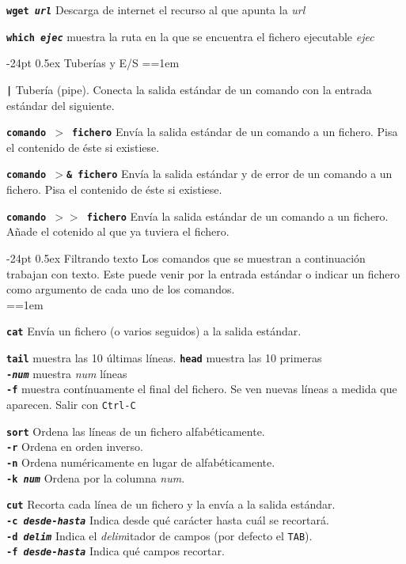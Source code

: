 \documentclass[10pt,landscape,a4paper]{article}
\makeatletter
\renewcommand\section{\@startsection{section}{1}{0mm}%
                                     {-24pt}%
                                     {0.5ex}%
                                {\normalfont\large\bfseries}}
\newcommand{\code}{\texttt}
\newcommand{\bcode}[1]{\texttt{\textbf{#1}}}
\makeatother
\begin{document}
\begin{multicols}{3}
\bcode{wget \emph{url}} Descarga de internet el recurso al que apunta la \emph{url}

\bcode{which \emph{ejec}} muestra la ruta en la que se encuentra el fichero ejecutable \emph{ejec}

\section{Tuberías y E/S}
\everypar={\hangindent=1em}

\bcode{|} Tubería (pipe). Conecta la salida estándar de un comando con la entrada estándar del siguiente.

\bcode{comando $>$ fichero} Envía la salida estándar de un comando a un fichero. Pisa el contenido de éste si existiese.

\bcode{comando $>$\& fichero} Envía la salida estándar y de error de un comando a un fichero. Pisa el contenido de éste si existiese.

\bcode{comando $>>$ fichero} Envía la salida estándar de un comando a un fichero. Añade el cotenido al que ya tuviera el fichero.

\section{Filtrando texto}
Los comandos que se muestran a continuación trabajan con texto. Este puede venir por la entrada estándar o indicar un fichero como argumento de cada uno de los comandos.\\[1mm]

\everypar={\hangindent=1em}

\bcode{cat} Envía un fichero (o varios seguidos) a la salida estándar.

\bcode{tail} muestra las 10 últimas líneas. \bcode{head} muestra las 10 primeras\\
  \bcode{-\emph{num}} muestra \emph{num} líneas\\
  \bcode{-f} muestra contínuamente el final del fichero. Se ven nuevas líneas a medida que aparecen. Salir con \code{Ctrl-C}

\bcode{sort} Ordena las líneas de un fichero alfabéticamente.\\
  \bcode{-r} Ordena en orden inverso.\\
  \bcode{-n} Ordena numéricamente en lugar de alfabéticamente.\\
  \bcode{-k \emph{num}} Ordena por la columna \emph{num}.

\bcode{cut} Recorta cada línea de un fichero y la envía a la salida estándar.\\
  \bcode{-c \emph{desde}-\emph{hasta}} Indica desde qué carácter hasta cuál se recortará.\\
  \bcode{-d \emph{delim}} Indica el \emph{delim}itador de campos (por defecto el \code{TAB}).\\
  \bcode{-f \emph{desde}-\emph{hasta}} Indica qué campos recortar.


\end{multicols}
\end{document}
